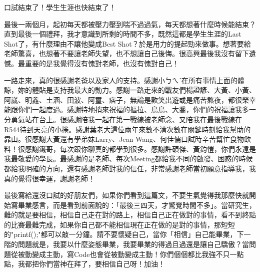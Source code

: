 \begin{acknowledgementsCH}

\setlength{\baselineskip}{1.5em}
口試結束了！學生生涯也快結束了！

最後一兩個月，起初每天都被壓力壓到喘不過過氣，每天都想著什麼時候能結束？直到最後一個禮拜，我才意識到所剩的時間不多，既然這都是學生生涯的Last Shot了，有什麼理由不讓他變成Best Shot？於是用力的提起勁來做事。想著要給老師驚喜，也想著不要讓老師失望，也不想讓自己後悔。很高興最後我沒有留下遺憾。最重要的是我覺得沒有愧對老師，也沒有愧對自己！

一路走來，真的很感謝老爸以及家人的支持。感謝小ㄅㄟˊ在所有事情上面的體諒，妳的體貼是支持我最大的動力。感謝一路走來的戰友們楊證諺、大黃、小黃、阿崴、明鑫、土涵、田波、阿璽、痞子，無論是歡笑出遊或是痛苦熬夜，都很榮幸能跟你們一起度過。感謝特地捎來祝褔的摳拉、鳥鳥、大喬，你們的祝福讓我多一分勇氣站在台上。很感謝陪我一起在第一戰線被老師念、又陪我在最後戰線在R544待到天亮的小捲。感謝葉老大這位兩年來數不清次數在關鍵時刻給我幫助的靠山。很感謝大黃還有學弟妹Larry、Jean Wang、何佳儒口試時辛苦幫忙食物飲料！很感謝鐵哥，每次跟你聊真的都學到很多。感謝許碩傑、黃鈞愷，你們永遠是我最敬愛的學長。最感謝的是老師、每次Meeting都給我不同的啟發、困惑的時候都給我明確的方向，還有感謝老師對我的信任，非常感謝老師當初願意指導我，我真的覺得很幸運，謝謝老師！

最後寫給還沒口試的好朋友們，如果你們看到這篇文，不要生氣覺得我那麼快就開始寫畢業感言，而是看到前面說的：「最後三四天，才驚覺時間不多」。當研究生，難的就是要相信，相信自己走在對的路上，相信自己正在做對的事情，看不到終點的比賽最難完成，如果你自己都不能相信現在正在做的是對的事情，那短短的"printf();"都可以敲一分鐘。請不要懷疑自己，當你「相信」自己能畢業，下一階的問題就是，我要以什麼姿態畢業，我要畢業的得過且過還是讓自己驕傲？當問題從被動變成主動，寫Code也會從被動變成主動！你們個個都比我強不只一點點，我都把你們當神在拜了，要相信自己呀！加油！



\end{acknowledgementsCH}
